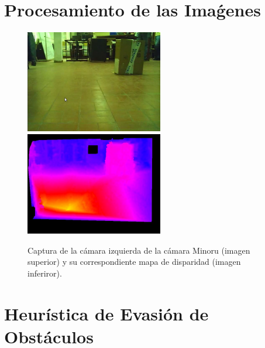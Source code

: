 \documentclass[journal]{IEEEtran}
\begin{document}
\section{Procesamiento de las Ima\'genes}
\label{sec:pro_img}

\begin{figure}[ht]
	\begin{center}
		\includegraphics[width=6cm]{./images/original.jpg}
		\includegraphics[width=6cm]{./images/disparidad.jpg}
		\caption{Captura de la c\'amara izquierda de la c\'amara Minoru (imagen superior) y su correspondiente mapa de disparidad (imagen inferiror).}
	\end{center}
\end{figure}

\section{Heur\'istica de Evasi\'on de Obst\'aculos}
\label{sec:heuristica}
\end{document}
